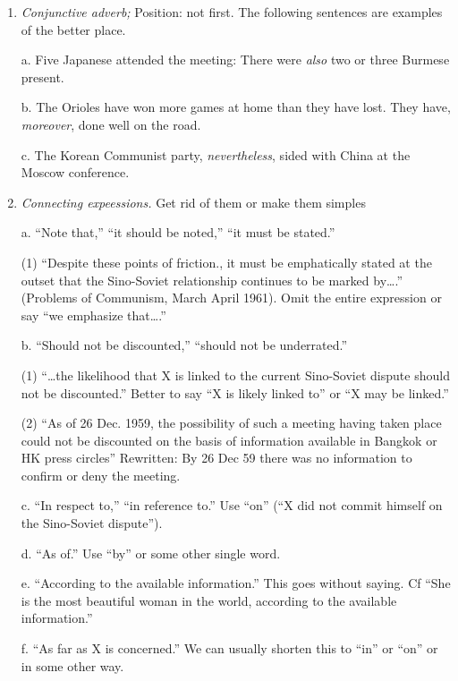 \documentclass[
    oneside,
    11pt,
    draft
]{memoir}
\begin{document}
\begin{enumerate} 
  
\item \emph{Conjunctive adverb;} Position: not first. The following sentences are examples of the better place.

a. Five Japanese attended the meeting: There were \emph{also} two or three Burmese present.

b. The Orioles have won more games at home than they have lost. They have, \emph{moreover}, done well on the road.

c. The Korean Communist party, \emph{nevertheless}, sided with China at the Moscow conference. 

\item \emph{Connecting expeessions.} Get rid of them or make them simples 
  
  a. \enquote{Note that,} \enquote{it should be noted,} \enquote{it must be stated.}

  (1) \enquote{Despite these points of friction., it must be emphatically stated at the outset that the Sino-Soviet relationship continues to be marked by\dots.} (Problems of Communism, March April 1961). Omit the entire expression or say \enquote{we emphasize that\dots.} 
  
  b. \enquote{Should not be discounted,} \enquote{should not be underrated.} 
  
  (1) \enquote{\dots the likelihood that X is linked to the current Sino-Soviet dispute should not be discounted.} Better to say \enquote{X is likely linked to} or \enquote{X may be linked.} 
  
  (2) \enquote{As of 26 Dec. 1959, the possibility of such a meeting having taken place could not be discounted on the basis of information available in Bangkok or HK press circles}  Rewritten: By 26 Dec 59 there was no information to confirm or deny the meeting.
  
  c. \enquote{In respect to,} \enquote{in reference to.} Use \enquote{on} (\enquote{X did not commit himself on the Sino-Soviet dispute}).

  d. \enquote{As of.} Use \enquote{by} or some other single word.
  
  e. \enquote{According to the available information.} This goes without saying. Cf \enquote{She is the most beautiful woman in the world, according to the available information.} 
  
  f. \enquote{As far as X is concerned.} We can usually shorten this to \enquote{in} or \enquote{on} or in some other way.
  

\end{enumerate}
\end{document}
